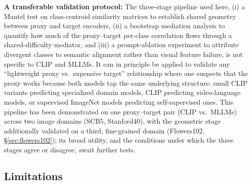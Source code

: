 \documentclass[a4paper,fleqn]{cas-sc}
\begin{document}
\textbf{A transferable validation protocol:} The three-stage pipeline used here, (i) a Mantel test on class-centroid similarity matrices to establish shared geometry between proxy and target encoders, (ii) a bootstrap mediation analysis to quantify how much of the proxy--target per-class correlation flows through a shared-difficulty mediator, and (iii) a prompt-ablation experiment to attribute divergent classes to semantic alignment rather than visual feature failure, is not specific to CLIP and MLLMs. It can in principle be applied to validate any ``lightweight proxy vs.\ expensive target'' relationship where one suspects that the proxy works because both models tap the same underlying structure: small CLIP variants predicting specialized domain models, CLIP predicting video-language models, or supervised ImageNet models predicting self-supervised ones. This pipeline has been demonstrated on one proxy--target pair (CLIP vs.\ MLLMs) across two image domains (SCB5, Stanford40), with the geometric stage additionally validated on a third, fine-grained domain (Flowers102, \S\ref{sec:flowers102}); its broad utility, and the conditions under which the three stages agree or disagree, await further tests.

\subsection{Limitations}
\label{sec:limitations}
\end{document}
